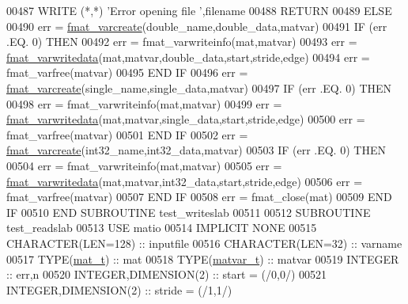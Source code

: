 \begin{DoxyCode}
{00487             \textcolor{keyword}{WRITE} (*,*) \textcolor{stringliteral}{'Error opening file '},filename
00488             \textcolor{keywordflow}{RETURN}
00489         \textcolor{keywordflow}{ELSE}
00490             err = \hyperlink{interfacematio_1_1fmat__varcreate}{fmat\_varcreate}(double\_name,double\_data,matvar)
00491             \textcolor{keywordflow}{IF} (err .EQ. 0) \textcolor{keywordflow}{THEN}
00492                 err = fmat\_varwriteinfo(mat,matvar)
00493                 err = \hyperlink{interfacematio_1_1fmat__varwritedata}{fmat\_varwritedata}(mat,matvar,double\_data,start,stride,edge)
00494                 err = fmat\_varfree(matvar)
00495 \textcolor{keywordflow}{            END IF}
00496             err = \hyperlink{interfacematio_1_1fmat__varcreate}{fmat\_varcreate}(single\_name,single\_data,matvar)
00497             \textcolor{keywordflow}{IF} (err .EQ. 0) \textcolor{keywordflow}{THEN}
00498                 err = fmat\_varwriteinfo(mat,matvar)
00499                 err = \hyperlink{interfacematio_1_1fmat__varwritedata}{fmat\_varwritedata}(mat,matvar,single\_data,start,stride,edge)
00500                 err = fmat\_varfree(matvar)
00501 \textcolor{keywordflow}{            END IF}
00502             err = \hyperlink{interfacematio_1_1fmat__varcreate}{fmat\_varcreate}(int32\_name,int32\_data,matvar)
00503             \textcolor{keywordflow}{IF} (err .EQ. 0) \textcolor{keywordflow}{THEN}
00504                 err = fmat\_varwriteinfo(mat,matvar)
00505                 err = \hyperlink{interfacematio_1_1fmat__varwritedata}{fmat\_varwritedata}(mat,matvar,int32\_data,start,stride,edge)
00506                 err = fmat\_varfree(matvar)
00507 \textcolor{keywordflow}{            END IF}
00508             err = fmat\_close(mat)
00509 \textcolor{keywordflow}{        END IF}
00510 \textcolor{keyword}{    END SUBROUTINE }test\_writeslab
00511 
00512 \textcolor{keyword}{    SUBROUTINE }test\_readslab
00513     \textcolor{keywordtype}{USE }matio
00514     \textcolor{keywordtype}{IMPLICIT NONE}
00515         \textcolor{keywordtype}{CHARACTER(LEN=128)} :: inputfile
00516         \textcolor{keywordtype}{CHARACTER(LEN=32)}  :: varname
00517         \textcolor{keywordtype}{TYPE}(\hyperlink{group___m_a_t_gab0fc888f5a5d79943b16284b1f91c2e8}{mat\_t})        :: mat
00518         \textcolor{keywordtype}{TYPE}(\hyperlink{group___m_a_t_structmatvar__t}{matvar\_t})     :: matvar
00519         \textcolor{keywordtype}{INTEGER}            :: err,n
00520         \textcolor{keywordtype}{INTEGER},\textcolor{keywordtype}{DIMENSION(2)} :: start  = (/0,0/)
00521         \textcolor{keywordtype}{INTEGER},\textcolor{keywordtype}{DIMENSION(2)} :: stride = (/1,1/)
}
\end{DoxyCode}
